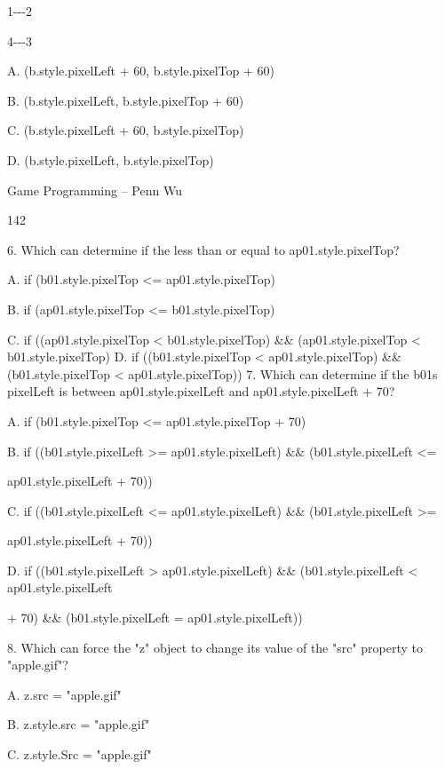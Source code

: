 \documentclass[
]{article}
\begin{document}
1-\/-\/-2

\textbar{} \textbar{}

\textbar{} \textbar{}

4-\/-\/-3

A. (b.style.pixelLeft + 60, b.style.pixelTop + 60)

B. (b.style.pixelLeft, b.style.pixelTop + 60)

C. (b.style.pixelLeft + 60, b.style.pixelTop)

D. (b.style.pixelLeft, b.style.pixelTop)

Game Programming -- Penn Wu

142

\protect\hypertarget{index_split_009.htmlux5cux23p143}{}{}

6. Which can determine if the less than or equal to ap01.style.pixelTop?

A. if (b01.style.pixelTop \textless= ap01.style.pixelTop)

B. if (ap01.style.pixelTop \textless= b01.style.pixelTop)

C. if ((ap01.style.pixelTop \textless{} b01.style.pixelTop) \&\&
(ap01.style.pixelTop \textless{} b01.style.pixelTop) D. if
((b01.style.pixelTop \textless{} ap01.style.pixelTop) \&\&
(b01.style.pixelTop \textless{} ap01.style.pixelTop)) 7. Which can
determine if the b01\textquotesingle s pixelLeft is between
ap01.style.pixelLeft and ap01.style.pixelLeft + 70?

A. if (b01.style.pixelTop \textless= ap01.style.pixelTop + 70)

B. if ((b01.style.pixelLeft \textgreater= ap01.style.pixelLeft) \&\&
(b01.style.pixelLeft \textless=

ap01.style.pixelLeft + 70))

C. if ((b01.style.pixelLeft \textless= ap01.style.pixelLeft) \&\&
(b01.style.pixelLeft \textgreater=

ap01.style.pixelLeft + 70))

D. if ((b01.style.pixelLeft \textgreater{} ap01.style.pixelLeft) \&\&
(b01.style.pixelLeft \textless{} ap01.style.pixelLeft

+ 70) \&\& (b01.style.pixelLeft = ap01.style.pixelLeft))

8. Which can force the "z" object to change its value of the "src"
property to "apple.gif"?

A. z.src = "apple.gif"

B. z.style.src = "apple.gif"

C. z.style.Src = "apple.gif"
\end{document}
